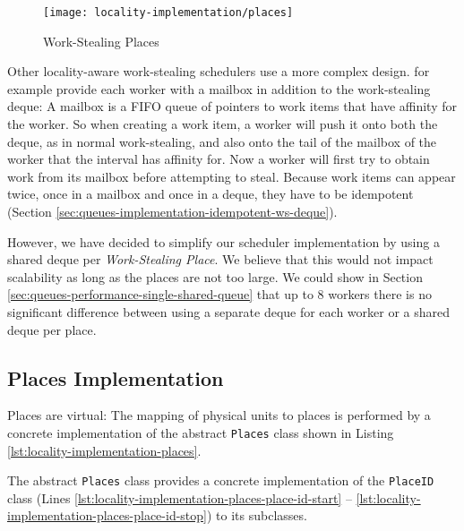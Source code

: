 \begin{figure}[!ht]
  \centering
  \texttt{[image: locality-implementation/places]}
  \caption{Work-Stealing Places}
  \label{fig:locality-implementation-work-stealing-places}
\end{figure}

Other locality-aware work-stealing schedulers use a more complex
design. \textcite{Acar2000} for example provide each worker with a
mailbox in addition to the work-stealing deque: A mailbox is a FIFO
queue of pointers to work items that have affinity for the worker. So
when creating a work item, a worker will push it onto both the deque,
as in normal work-stealing, and also onto the tail of the mailbox of
the worker that the interval has affinity for. Now a worker will first
try to obtain work from its mailbox before attempting to
steal. Because work items can appear twice, once in a mailbox and once
in a deque, they have to be idempotent (Section
\ref{sec:queues-implementation-idempotent-ws-deque}).

However, we have decided to simplify our scheduler implementation by
using a shared deque per \emph{Work-Stealing Place}. We believe that
this would not impact scalability as long as the places are not too
large. We could show in Section
\ref{sec:queues-performance-single-shared-queue} that up to 8 workers
there is no significant difference between using a separate deque for
each worker or a shared deque per place.

\subsection{Places Implementation}
\label{sec:locality-implementation-work-stealing-places-implementation}

Places are virtual: The mapping of physical units to places is
performed by a concrete implementation of the abstract
\lstinline!Places! class shown in Listing
\ref{lst:locality-implementation-places}.



The abstract \lstinline!Places! class provides a concrete
implementation of the \lstinline!PlaceID! class (Lines
\ref{lst:locality-implementation-places-place-id-start} --
\ref{lst:locality-implementation-places-place-id-stop}) to its
subclasses. 

